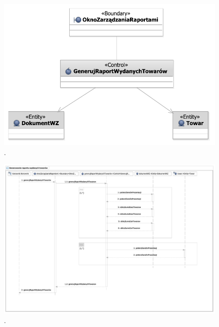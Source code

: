 \begin{figure}[H]
  \centering
  \includegraphics[angle=\ecbangle, scale=\ecbscale]{../img/usecase/pu6ecb.pdf}
  \caption{.}
\end{figure}
\begin{figure}[H]
  \centering
  \includegraphics[angle=\seqangle, scale=0.45]{../img/usecase/pu6seq.pdf}
  \caption{.}
\end{figure}
\newpage


